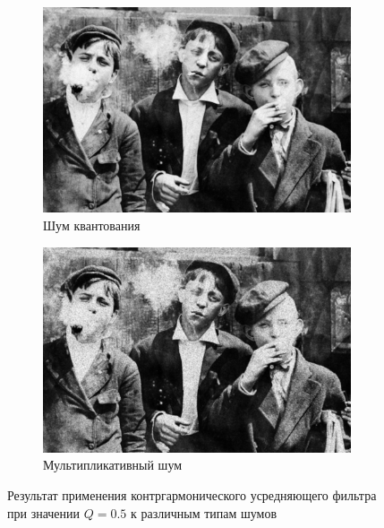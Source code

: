 \begin{figure}[ht]
\begin{subfigure}[b]{0.5\linewidth}
      \includegraphics[width=0.95\linewidth]{../Contraharmonic_Filter/Contraharmonic_Poisson_noise_(m,n=(3,_3),q=0.5).jpg} 
      \caption{Шум квантования} 
      \label{contraharmonic_0.5:e}
    \end{subfigure}%
    \begin{subfigure}[b]{0.5\linewidth}
        \centering
        \includegraphics[width=0.95\linewidth]{../Contraharmonic_Filter/Contraharmonic_Speckle_noise_(m,n=(3,_3),q=0.5).jpg} 

        \caption{Мультипликативный шум} 
        \label{contraharmonic_0.5:f} 
    \end{subfigure} 
    \caption{Результат применения контргармонического усредняющего фильтра при значении $Q = 0.5$ к различным типам шумов}
    \label{img:contraharmonic_0.5} 
  \end{figure}

